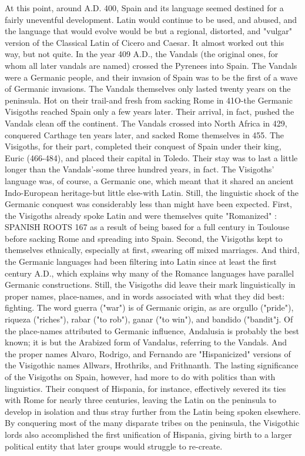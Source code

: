 \documentclass[14pt,a4paper,oneside]{memoir}
\begin{document}
{{{{%
At this point, around A.D. 400, Spain and its language seemed
destined for a fairly uneventful development. Latin would continue to
be used, and abused, and the language that would evolve would be but
a regional, distorted, and "vulgar" version of the Classical Latin of
Cicero and Caesar.
It almost worked out this way, but not quite. In the year
409 A.D., the Vandals (the original ones, for whom all later vandals are
named) crossed the Pyrenees into Spain. The Vandals were a Germanic
people, and their invasion of Spain was to be the first of a wave of Germanic invasions. The Vandals themselves only lasted twenty years
on the peninsula. Hot on their trail-and fresh from sacking Rome in
41O-the Germanic Visigoths reached Spain only a few years later.
Their arrival, in fact, pushed the Vandals clean off the continent. The
Vandals crossed into North Africa in 429, conquered Carthage ten
years later, and sacked Rome themselves in 455. The Visigoths, for
their part, completed their conquest of Spain under their king, Euric
(466-484), and placed their capital in Toledo. Their stay was to last a
little longer than the Vandals'-some three hundred years, in fact.
The Visigoths' language was, of course, a Germanic one,
which meant that it shared an ancient Indo-European heritage-but
little else-with Latin. Still, the linguistic shock of the Germanic conquest was considerably less than might have been expected. First, the
Visigoths already spoke Latin and were themselves quite "Romanized" :
SPANISH ROOTS 167
as a result of being based for a full century in Toulouse before sacking
Rome and spreading into Spain. Second, the Visigoths kept to themselves ethnically, especially at first, swearing off mixed marriages. And
third, the Germanic languages had been filtering into Latin since at
least the first century A.D., which explains why many of the Romance
languages have parallel Germanic constructions.
Still, the Visigoths did leave their mark linguistically in proper
names, place-names, and in words associated with what they did best:
fighting. The word guerra ("war") is of Germanic origin, as are orgullo
("pride"), riqueza ("riches"), rabar ("to rob"), ganar ("to win"), and
bandido ("bandit"j. Of the place-names attributed to Germanic influence, Andalusia is probably the best known; it is but the Arabized
form of Vandalus, referring to the Vandals. And the proper names Alvaro, Rodrigo, and Fernando are "Hispanicized" versions of the Visigothic names Allwars, Hrothriks, and Frithnanth.
The lasting significance of the Visigoths on Spain, however,
had more to do with politics than with linguistics. Their conquest of
Hispania, for instance, effectively severed its ties with Rome for nearly
three centuries, leaving the Latin on the peninsula to develop in isolation and thus stray further from the Latin being spoken elsewhere. By
conquering most of the many disparate tribes on the peninsula, the
Visigothic lords also accomplished the first unification of Hispania,
giving birth to a larger political entity that later groups would struggle
to re-create.

}}}}
\end{document}
